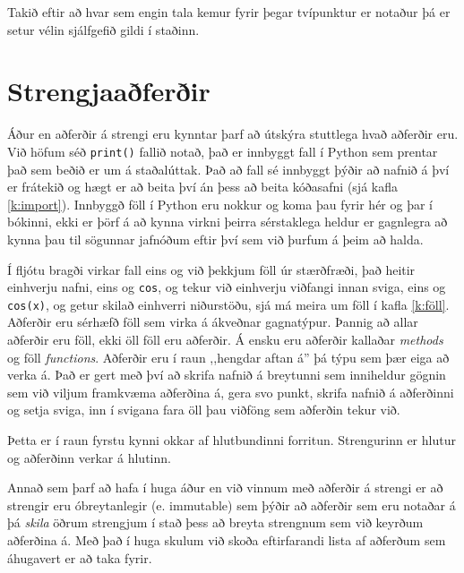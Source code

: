 Takið eftir að hvar sem engin tala kemur fyrir þegar tvípunktur er notaður þá er setur vélin sjálfgefið gildi í staðinn.

\section{Strengjaaðferðir}
Áður en aðferðir á strengi eru kynntar þarf að útskýra stuttlega hvað aðferðir eru.
Við höfum séð \texttt{print()} fallið notað, það er innbyggt fall í Python sem prentar það sem beðið er um á staðalúttak.
Það að fall sé innbyggt þýðir að nafnið á því er frátekið og hægt er að beita því án þess að beita kóðasafni (sjá kafla \ref{k:import}).
Innbyggð föll í Python eru nokkur og koma þau fyrir hér og þar í bókinni, ekki er þörf á að kynna virkni þeirra sérstaklega heldur er gagnlegra að kynna þau til sögunnar jafnóðum eftir því sem við þurfum á þeim að halda.

Í fljótu bragði virkar fall eins og við þekkjum föll úr stærðfræði, það heitir einhverju nafni, eins og \texttt{cos}, og tekur við einhverju viðfangi innan sviga, eins og \texttt{cos(x)}, og getur skilað einhverri niðurstöðu, sjá má meira um föll í kafla \ref{k:föll}.
Aðferðir eru sérhæfð föll sem virka á ákveðnar gagnatýpur.
Þannig að allar aðferðir eru föll, ekki öll föll eru aðferðir.
Á ensku eru aðferðir kallaðar \textit{methods} og föll \textit{functions}.
Aðferðir eru í raun ,,hengdar aftan á'' þá týpu sem þær eiga að verka á.
Það er gert með því að skrifa nafnið á breytunni sem inniheldur gögnin sem við viljum framkvæma aðferðina á, gera svo punkt, skrifa nafnið á aðferðinni og setja sviga, inn í svigana fara öll þau viðföng sem aðferðin tekur við.

Þetta er í raun fyrstu kynni okkar af hlutbundinni forritun.
Strengurinn er hlutur og aðferðinn verkar á hlutinn.

Annað sem þarf að hafa í huga áður en við vinnum með aðferðir á strengi er að strengir eru óbreytanlegir (e. immutable) sem þýðir að aðferðir sem eru notaðar á þá \emph{skila} öðrum strengjum í stað þess að breyta strengnum sem við keyrðum aðferðina á.
Með það í huga skulum við skoða eftirfarandi lista af aðferðum sem áhugavert er að taka fyrir.
\vspace{10px}

